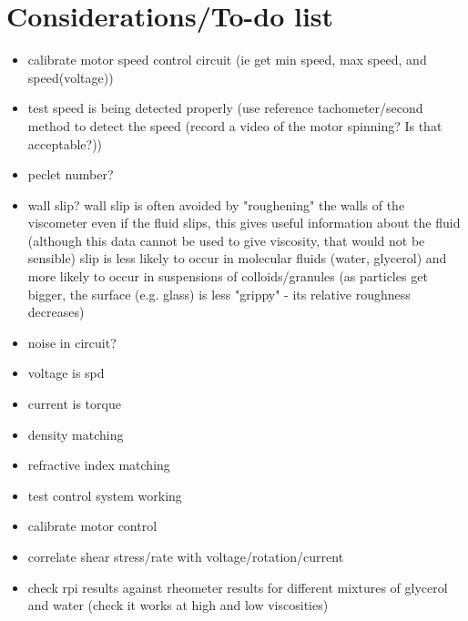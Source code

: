 \documentclass[a4]{report}
\begin{document}
	\section{Considerations/To-do list}
	\begin{itemize}
		\item calibrate motor speed control circuit (ie get min speed, max speed, and speed(voltage))
		\item test speed is being detected properly (use reference tachometer/second method to detect the speed (record a video of the motor spinning? Is that acceptable?))
		\item peclet number?
		\item wall slip?
		\subitem wall slip is often avoided by "roughening" the walls of the viscometer
		\subitem even if the fluid slips, this gives useful information about the fluid (although this data cannot be used to give viscosity, that would not be sensible)
		\subitem slip is less likely to occur in molecular fluids (water, glycerol) and more likely to occur in suspensions of colloids/granules (as particles get bigger, the surface (e.g. glass) is less "grippy" - its relative roughness decreases)
		\item noise in circuit?
		\item voltage is spd
		\item current is torque
		\item density matching
		\item refractive index matching
		\item test control system working
		\item calibrate motor control
		\item correlate shear stress/rate with voltage/rotation/current
		\item check rpi results against rheometer results for different mixtures of glycerol and water (check it works at high and low viscosities)
	\end{itemize}
	
\end{document}
